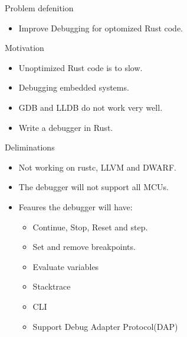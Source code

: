 
\begin{frame}{Problem defenition}
    \begin{itemize}
        \item Improve Debugging for optomized Rust code.
    \end{itemize}
\end{frame}


\begin{frame}{Motivation}
    \begin{itemize}
        \item Unoptimized Rust code is to slow.
        \item Debugging embedded systems.
        \item GDB and LLDB do not work very well.
        \item Write a debugger in Rust.
    \end{itemize}
\end{frame}


\begin{frame}{Deliminations}
    \begin{itemize}
        \item Not working on rustc, LLVM and DWARF.
        \item The debugger will not support all MCUs.
        \item Feaures the debugger will have:
    	\begin{itemize}
		\item Continue, Stop, Reset and step.
		\item Set and remove breakpoints.
		\item Evaluate variables
		\item Stacktrace
		\item CLI
		\item Support Debug Adapter Protocol(DAP)
    	\end{itemize}
    \end{itemize}
\end{frame}


